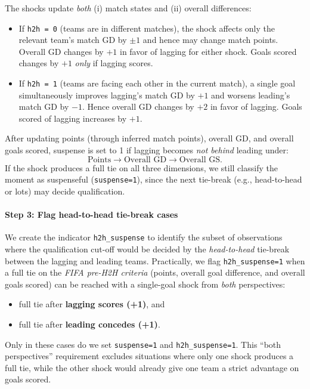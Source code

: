 \documentclass[11pt]{article}
\begin{document}
\noindent The shocks update \emph{both} (i) match states and (ii) overall differences:
\begin{itemize}
    \item If \texttt{h2h = 0} (teams are in different matches), the shock affects only the relevant team's match GD by $\pm 1$ and hence may change match points. Overall GD changes by $+1$ in favor of lagging for either shock. Goals scored changes by $+1$ \emph{only} if lagging scores.
    \item If \texttt{h2h = 1} (teams are facing each other in the current match), a single goal simultaneously improves lagging's match GD by $+1$ and worsens leading's match GD by $-1$. Hence overall GD changes by $+2$ in favor of lagging. Goals scored of lagging increases by $+1$.
\end{itemize}

\noindent After updating points (through inferred match points), overall GD, and overall goals scored, suspense is set to 1 if lagging becomes \emph{not behind} leading under:
\[
\text{Points} \rightarrow \text{Overall GD} \rightarrow \text{Overall GS}.
\]
If the shock produces a full tie on all three dimensions, we still classify the moment as suspenseful (\texttt{suspense=1}), since the next tie-break (e.g., head-to-head or lots) may decide qualification.

\paragraph{Step 3: Flag head-to-head tie-break cases }
We create the indicator \texttt{h2h\_suspense} to identify the subset of observations where the qualification cut-off would be decided by the \emph{head-to-head} tie-break between the lagging and leading teams.
Practically, we flag \texttt{h2h\_suspense=1} when a full tie on the \emph{FIFA pre-H2H criteria} (points, overall goal difference, and overall goals scored) can be reached with a single-goal shock from \emph{both} perspectives:
\begin{itemize}
    \item full tie after \textbf{lagging scores (+1)}, and
    \item full tie after \textbf{leading concedes (+1)}.
\end{itemize}
Only in these cases do we set \texttt{suspense=1} and \texttt{h2h\_suspense=1}.
This ``both perspectives'' requirement excludes situations where only one shock produces a full tie, while the other shock would already give one team a strict advantage on goals scored.
\end{document}
